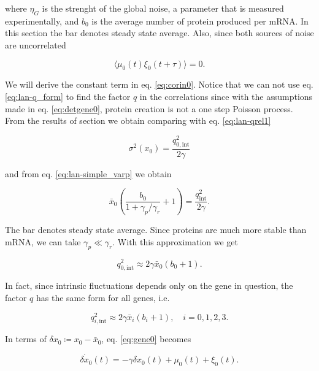 where $\eta_G$ is the strenght of the global noise, a parameter that is measured experimentally, and $b_0$ is the average number of protein produced per mRNA. In this section the bar denotes steady state average. Also, since both sources of noise are uncorrelated

\begin{equation}
\label{eq:corinex0}
\langle\mu_0(t)\xi_0(t+\tau)\rangle = 0.
\end{equation}

We will derive the constant term in eq. \eqref{eq:corin0}. Notice that we can not use eq. \eqref{eq:lan-q_form} to find the factor $q$ in the correlations since with the assumptions made in eq. \eqref{eq:detgene0}, protein creation is not a one step Poisson process. From the results of section \label{sec:lan-single} we obtain comparing with eq. \eqref{eq:lan-qrel1}

\begin{equation*}
  \sigma^2(x_0) = \frac{q_{0,\text{int}}^2}{2\gamma}
\end{equation*}

and from eq. \eqref{eq:lan-simple_varp} we obtain

\begin{equation*}
  \bar{x}_0\left(\frac{b_0}{1+\gamma_p/\gamma_r}+1\right) = \frac{q_\text{int}^2}{2\gamma}.
\end{equation*}

The bar denotes steady state average. Since proteins are much more stable than mRNA, we can take $\gamma_p\ll\gamma_r$. With this approximation we get

\begin{equation*}
  q_{0,\text{int}}^2 \approx 2\gamma\bar{x}_0(b_0+1).
\end{equation*}

In fact, since intrinsic fluctuations depends only on the gene in question, the factor $q$ has the same form for all genes, i.e.

\begin{equation*}
  q_{i,\text{int}}^2 \approx 2\gamma\bar{x}_i(b_i+1),\quad i = 0,1,2,3.
\end{equation*}

In terms of $\delta x_0 \coloneqq x_0 - \bar{x}_0$, eq. \eqref{eq:gene0} becomes

\begin{equation}
\label{eq:dgene0}
\dot{\delta x_0}(t) = -\gamma \delta x_0(t) + \mu_0(t) + \xi_0(t).
\end{equation}

